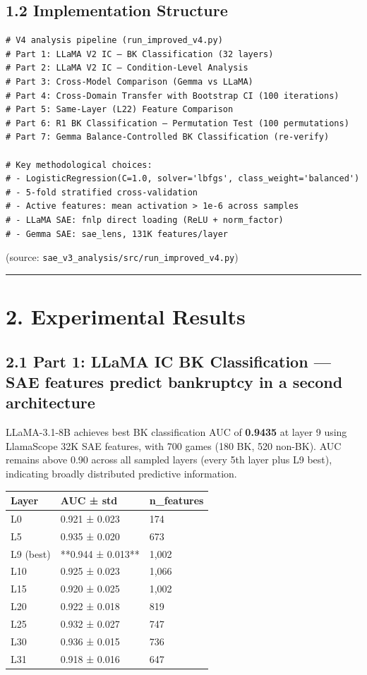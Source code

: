 \documentclass[11pt,a4paper]{article}
\begin{document}
\subsection{1.2 Implementation Structure}

\begin{verbatim}
# V4 analysis pipeline (run_improved_v4.py)
# Part 1: LLaMA V2 IC — BK Classification (32 layers)
# Part 2: LLaMA V2 IC — Condition-Level Analysis
# Part 3: Cross-Model Comparison (Gemma vs LLaMA)
# Part 4: Cross-Domain Transfer with Bootstrap CI (100 iterations)
# Part 5: Same-Layer (L22) Feature Comparison
# Part 6: R1 BK Classification — Permutation Test (100 permutations)
# Part 7: Gemma Balance-Controlled BK Classification (re-verify)

# Key methodological choices:
# - LogisticRegression(C=1.0, solver='lbfgs', class_weight='balanced')
# - 5-fold stratified cross-validation
# - Active features: mean activation > 1e-6 across samples
# - LLaMA SAE: fnlp direct loading (ReLU + norm_factor)
# - Gemma SAE: sae_lens, 131K features/layer
\end{verbatim}

(source: \texttt{sae_v3_analysis/src/run_improved_v4.py})

\bigskip\hrule\bigskip

\section{2. Experimental Results}

\subsection{2.1 Part 1: LLaMA IC BK Classification — SAE features predict bankruptcy in a second architecture}

LLaMA-3.1-8B achieves best BK classification AUC of \textbf{0.9435} at layer 9 using LlamaScope 32K SAE features, with 700 games (180 BK, 520 non-BK). AUC remains above 0.90 across all sampled layers (every 5th layer plus L9 best), indicating broadly distributed predictive information.

\begin{table}[htbp]
\centering
\footnotesize
\begin{tabular}{|l|l|l|}
\hline
Layer & AUC ± std & n\_features \\
\hline
L0 & 0.921 ± 0.023 & 174 \\
L5 & 0.935 ± 0.020 & 673 \\
L9 (best) & **0.944 ± 0.013** & 1,002 \\
L10 & 0.925 ± 0.023 & 1,066 \\
L15 & 0.920 ± 0.025 & 1,002 \\
L20 & 0.922 ± 0.018 & 819 \\
L25 & 0.932 ± 0.027 & 747 \\
L30 & 0.936 ± 0.015 & 736 \\
L31 & 0.918 ± 0.016 & 647 \\
\hline
\end{tabular}
\end{table}
\end{document}
